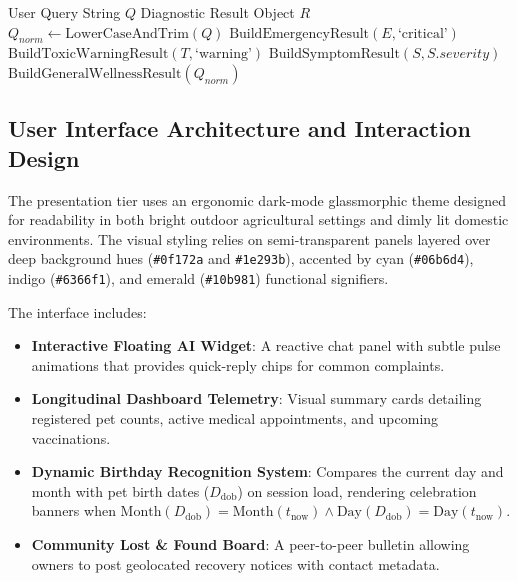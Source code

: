 \documentclass[conference]{IEEEtran}
\begin{document}
\begin{algorithm}[h]
\caption{Heuristic Symptom Triage and Toxicological Classifier}
\label{alg:nlp_triage}
\begin{algorithmic}[1]
\REQUIRE User Query String $Q$
\ENSURE Diagnostic Result Object $R$
\STATE $Q_{norm} \leftarrow \text{LowerCaseAndTrim}(Q)$
        \RETURN $\text{BuildEmergencyResult}(E, \text{`critical'})$
    \ENDIF
\ENDFOR
{}
        \RETURN $\text{BuildToxicWarningResult}(T, \text{`warning'})$
    \ENDIF
\ENDFOR
{}
        \RETURN $\text{BuildSymptomResult}(S, S.severity)$
    \ENDIF
\ENDFOR
\RETURN $\text{BuildGeneralWellnessResult}(Q_{norm})$
\end{algorithmic}
\end{algorithm}

\subsection{User Interface Architecture and Interaction Design}
The presentation tier uses an ergonomic dark-mode glassmorphic theme designed for readability in both bright outdoor agricultural settings and dimly lit domestic environments. The visual styling relies on semi-transparent panels layered over deep background hues (\texttt{\#0f172a} and \texttt{\#1e293b}), accented by cyan (\texttt{\#06b6d4}), indigo (\texttt{\#6366f1}), and emerald (\texttt{\#10b981}) functional signifiers.

The interface includes:
\begin{itemize}
    \item \textbf{Interactive Floating AI Widget}: A reactive chat panel with subtle pulse animations that provides quick-reply chips for common complaints.
    \item \textbf{Longitudinal Dashboard Telemetry}: Visual summary cards detailing registered pet counts, active medical appointments, and upcoming vaccinations.
    \item \textbf{Dynamic Birthday Recognition System}: Compares the current day and month with pet birth dates ($D_{\text{dob}}$) on session load, rendering celebration banners when $\text{Month}(D_{\text{dob}}) = \text{Month}(t_{\text{now}}) \land \text{Day}(D_{\text{dob}}) = \text{Day}(t_{\text{now}})$.
    \item \textbf{Community Lost \& Found Board}: A peer-to-peer bulletin allowing owners to post geolocated recovery notices with contact metadata.
\end{itemize}
\end{document}
